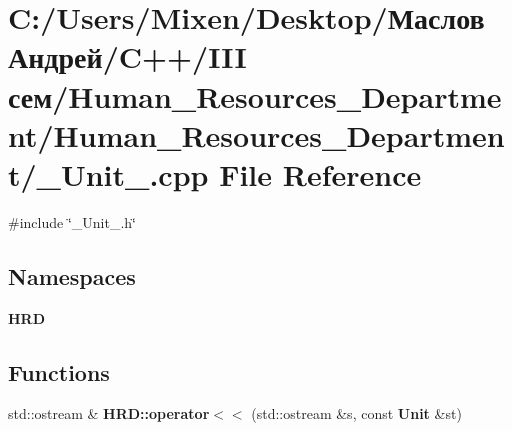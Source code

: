 \section{C\+:/\+Users/\+Mixen/\+Desktop/Маслов Андрей/\+C++/\+I\+II сем/\+Human\+\_\+\+Resources\+\_\+\+Department/\+Human\+\_\+\+Resources\+\_\+\+Department/\+\_\+\+Unit\+\_\+.cpp File Reference}
\label{___unit___8cpp}
{\ttfamily \#include \char`\"{}\+\_\+\+Unit\+\_\+.\+h\char`\"{}}\newline
\subsection*{Namespaces}
\begin{DoxyCompactItemize}
\item 
 \textbf{ H\+RD}
\end{DoxyCompactItemize}
\subsection*{Functions}
\begin{DoxyCompactItemize}
\item 
std\+::ostream \& \textbf{ H\+R\+D\+::operator$<$$<$} (std\+::ostream \&s, const \textbf{ Unit} \&st)
\end{DoxyCompactItemize}
